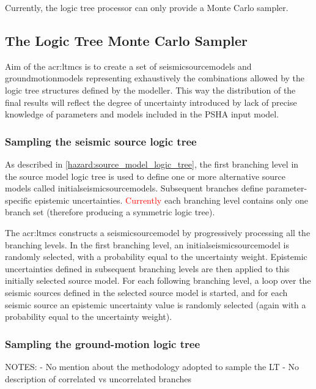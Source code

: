 Currently, the logic tree processor can only provide a Monte 
Carlo sampler.
%
\subsection{The Logic Tree Monte Carlo Sampler}
Aim of the \gls{acr:ltmcs} is to create a set of \glspl{seismicsourcemodel} 
and \glspl{groundmotionmodel} representing exhaustively the combinations 
allowed by the logic tree structures defined by the modeller.
% 
This way the distribution of the final results will reflect 
the degree of uncertainty introduced by lack of precise knowledge 
of parameters and models included in the PSHA input model.
%
\subsubsection{Sampling the seismic source logic tree}
As described in \ref{hazard:source_model_logic_tree}, the first branching 
level in the source model logic tree is used to define one or more 
alternative source models called \glspl{initialseismicsourcemodel}. 
%
Subsequent branches define parameter-specific epistemic uncertainties. 
\textcolor{red}{Currently} each branching level contains only one 
branch set (therefore producing a symmetric logic tree). 

The \gls{acr:ltmcs} constructs a \gls{seismicsourcemodel} by progressively
processing all the branching levels. In the first branching level, an 
\gls{initialseismicsourcemodel} is randomly selected, with a probability 
equal to the uncertainty 
weight. 
%
Epistemic uncertainties defined in subsequent branching levels are then 
applied to this initially selected source model. For each following 
branching level, a loop over the seismic sources defined in the selected
source model is started, and for each seismic source an epistemic 
uncertainty value is randomly selected (again with a probability equal to 
the uncertainty weight).
%
\subsubsection{Sampling the ground-motion logic tree}

\dotfill \newline
NOTES:
- No mention about the methodology adopted to sample the LT
- No description of correlated vs uncorrelated branches
\hfill \clearpage

